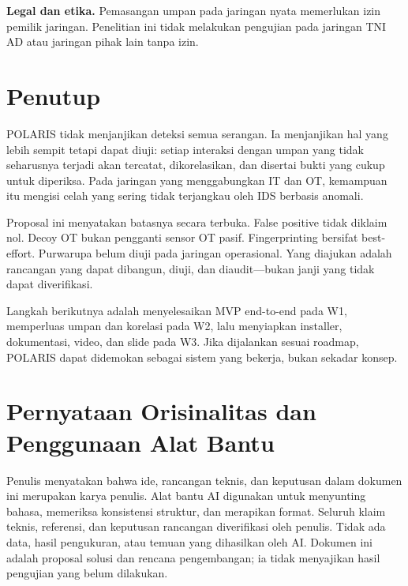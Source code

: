 \documentclass[12pt,a4paper]{article}
\begin{document}
\textbf{Legal dan etika.} Pemasangan umpan pada jaringan nyata memerlukan izin pemilik jaringan. Penelitian ini tidak melakukan pengujian pada jaringan TNI AD atau jaringan pihak lain tanpa izin.

\section{Penutup}

POLARIS tidak menjanjikan deteksi semua serangan. Ia menjanjikan hal yang lebih sempit tetapi dapat diuji: setiap interaksi dengan umpan yang tidak seharusnya terjadi akan tercatat, dikorelasikan, dan disertai bukti yang cukup untuk diperiksa. Pada jaringan yang menggabungkan IT dan OT, kemampuan itu mengisi celah yang sering tidak terjangkau oleh IDS berbasis anomali.

Proposal ini menyatakan batasnya secara terbuka. False positive tidak diklaim nol. Decoy OT bukan pengganti sensor OT pasif. Fingerprinting bersifat best-effort. Purwarupa belum diuji pada jaringan operasional. Yang diajukan adalah rancangan yang dapat dibangun, diuji, dan diaudit---bukan janji yang tidak dapat diverifikasi.

Langkah berikutnya adalah menyelesaikan MVP end-to-end pada W1, memperluas umpan dan korelasi pada W2, lalu menyiapkan installer, dokumentasi, video, dan slide pada W3. Jika dijalankan sesuai roadmap, POLARIS dapat didemokan sebagai sistem yang bekerja, bukan sekadar konsep.

\section*{Pernyataan Orisinalitas dan Penggunaan Alat Bantu}

Penulis menyatakan bahwa ide, rancangan teknis, dan keputusan dalam dokumen ini merupakan karya penulis. Alat bantu AI digunakan untuk menyunting bahasa, memeriksa konsistensi struktur, dan merapikan format. Seluruh klaim teknis, referensi, dan keputusan rancangan diverifikasi oleh penulis. Tidak ada data, hasil pengukuran, atau temuan yang dihasilkan oleh AI. Dokumen ini adalah proposal solusi dan rencana pengembangan; ia tidak menyajikan hasil pengujian yang belum dilakukan.
\end{document}
